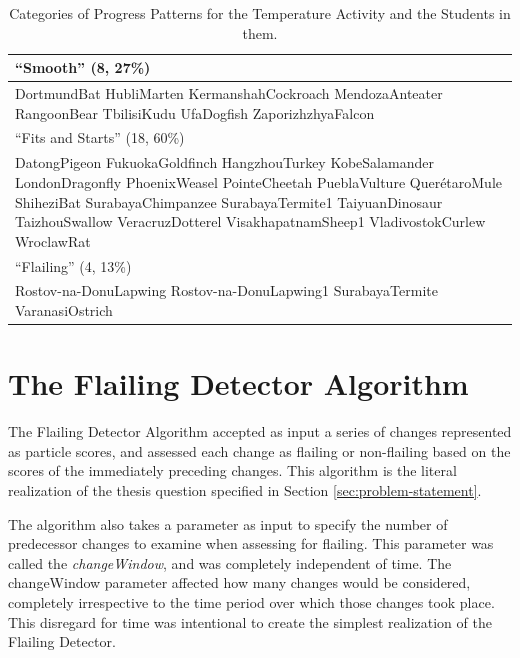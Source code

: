 \begin{table}
\begin{centering}
	\begin{tabular}{p{\textwidth}}
	\hline \hline
	``Smooth'' (8, 27\%)\\ \hline
		DortmundBat
		HubliMarten
		KermanshahCockroach
		MendozaAnteater
		RangoonBear
		TbilisiKudu
		UfaDogfish
		ZaporizhzhyaFalcon
		\\ \hline \hline
	``Fits and Starts'' (18, 60\%)\\ \hline
		DatongPigeon
		FukuokaGoldfinch
		HangzhouTurkey
		KobeSalamander
		LondonDragonfly
		PhoenixWeasel
		PointeCheetah
		PueblaVulture
		QuerétaroMule
		ShiheziBat
		SurabayaChimpanzee
		SurabayaTermite1
		TaiyuanDinosaur
		TaizhouSwallow
		VeracruzDotterel
		VisakhapatnamSheep1
		VladivostokCurlew
		WroclawRat
		\\ \hline \hline
	``Flailing'' (4, 13\%)\\ \hline
		Rostov-na-DonuLapwing
		Rostov-na-DonuLapwing1
		SurabayaTermite
		VaranasiOstrich
		\\ \hline

	\end{tabular}
	\caption[Categories of Progress Patterns for the Temperature Activity and the Students in them]{Categories of Progress Patterns for the Temperature Activity and the Students in them.}
	\label{tab:pattern_names_temp}
\end{centering}
\end{table}



\section{The Flailing Detector Algorithm}
\label{sec:the-flailing-detector}
The Flailing Detector Algorithm accepted as input a series of changes represented as particle scores, and assessed each change as flailing or non-flailing based on the scores of the immediately preceding changes. This algorithm is the literal realization of the thesis question specified in Section \ref{sec:problem-statement}. 

The algorithm also takes a parameter as input to specify the number of predecessor changes to examine when assessing for flailing. This parameter was called the \emph{changeWindow}, and was completely independent of time. The changeWindow parameter affected how many changes would be considered, completely irrespective to the time period over which those changes took place. This disregard for time was intentional to create the simplest realization of the Flailing Detector.


